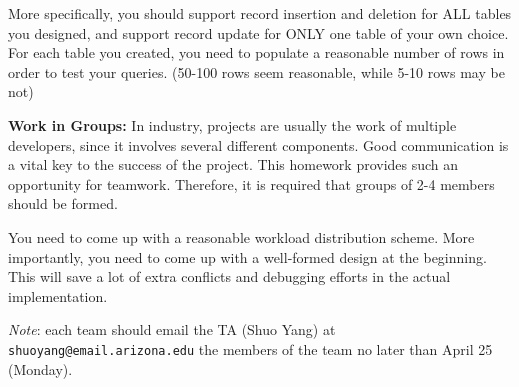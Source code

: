 \documentclass{article}
\begin{document}
More specifically, you should support record insertion and deletion
for ALL tables you designed, and support record update for ONLY one
table of your own choice. For each table you created, you need to
populate a reasonable number of rows in order to test your
queries. (50-100 rows seem reasonable, while 5-10 rows may be not)

\textbf{Work in Groups:}
In industry, projects are usually the work of
multiple developers, since it involves several different components.
Good communication is a vital key to the success of the project. This
homework provides such an opportunity for teamwork. Therefore, it is
required that groups of 2-4 members should be formed.

You need to come up with a reasonable workload distribution
scheme. More importantly, you need to come up with a well-formed
design at the beginning. This will save a lot of extra conflicts and
debugging efforts in the actual implementation.

\emph{Note}: each team should email the TA (Shuo Yang) at
\texttt{shuoyang@email.arizona.edu} the members
of the team no later than April 25 (Monday).
\end{document}
